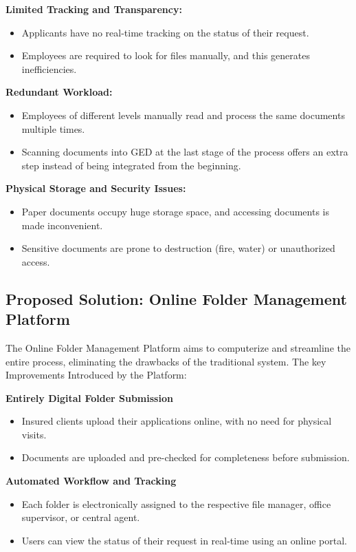 \textbf{ Limited Tracking and Transparency:}
\begin{itemize}
    \item Applicants have no real-time tracking on the status of their request.
    \item Employees are required to look for files manually, and this generates inefficiencies.
\end{itemize}

\textbf{ Redundant Workload:}
\begin{itemize}
    \item Employees of different levels manually read and process the same documents multiple times.
    \item Scanning documents into GED at the last stage of the process offers an extra step instead of being integrated from the beginning.
\end{itemize}

\textbf{ Physical Storage and Security Issues:}
\begin{itemize}
    \item Paper documents occupy huge storage space, and accessing documents is made inconvenient.
    \item Sensitive documents are prone to destruction (fire, water) or unauthorized access.
\end{itemize}

\subsection{Proposed Solution: Online Folder Management Platform}
The Online Folder Management Platform aims to computerize and streamline the entire process, eliminating the drawbacks of the traditional system. The key Improvements Introduced by the Platform:

\textbf{ Entirely Digital Folder Submission}
\begin{itemize}
    \item Insured clients upload their applications online, with no need for physical visits.
    \item Documents are uploaded and pre-checked for completeness before submission.
\end{itemize}

 \textbf{ Automated Workflow and Tracking}
\begin{itemize}
    \item Each folder is electronically assigned to the respective file manager, office supervisor, or central agent.
    \item Users can view the status of their request in real-time using an online portal.
\end{itemize}

